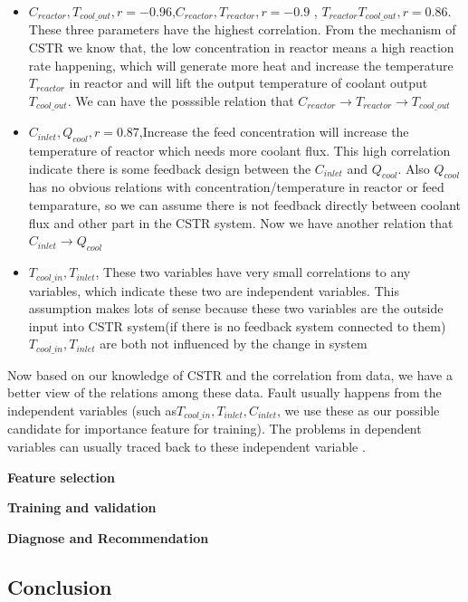 \documentclass[fleqn,11pt]{wlscirep}
\begin{document}
\begin{itemize}
     \item {$C_{reactor} ,T_{cool\_out}, r=-0.96$,$C_{reactor} ,T_{reactor},r=-0.9$ ,  $T_{reactor} T_{cool\_out},r=0.86$. These three parameters have the highest correlation. From the mechanism of CSTR we know that, the low concentration in reactor means a high reaction rate happening, which will generate more heat and increase the temperature$T_{reactor}$ in reactor and will lift the output temperature of coolant output$T_{cool\_out}$. We can have the posssible relation that  $C_{reactor} \rightarrow T_{reactor} \rightarrow T_{cool\_out} $ } 
      \item {$C_{inlet} ,Q_{cool}, r=0.87$,Increase the feed concentration will increase the temperature of reactor which needs more coolant flux. This high correlation indicate there is some feedback design between the $C_{inlet}$  and $ Q_{cool}$. Also $Q_{cool}$ has  no obvious relations with concentration/temperature in reactor or feed temparature, so we can assume there is not feedback directly between coolant flux and other part in the CSTR system. Now we have another relation that
      $C_{inlet} \rightarrow Q_{cool}$ } 
        \item {$T_{cool\_in} ,T_{inlet}$, These two variables have very small correlations to any variables, which indicate these two are independent variables. This assumption makes lots of sense because these two variables are the outside input into CSTR system(if there is no feedback system connected to them) $T_{cool\_in} ,T_{inlet}$ are both not influenced by the change in system } 
\end{itemize}
Now based on our knowledge of CSTR and the correlation from data, we have a better view of the relations among these data. Fault usually happens from the independent variables (such as$T_{cool\_in} ,T_{inlet}, C_{inlet}$, we use these as our possible candidate for importance feature for training). The problems in dependent variables can usually traced back to these independent variable . 

\textbf{Feature selection}


\textbf{Training and validation}

\textbf{Diagnose and Recommendation }
 
\subsection*{Conclusion}


\end{document}
